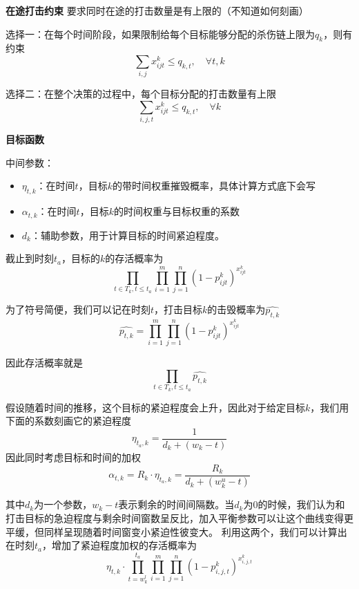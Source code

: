 \textbf{在途打击约束}
要求同时在途的打击数量是有上限的（不知道如何刻画）

选择一：在每个时间阶段，如果限制给每个目标能够分配的杀伤链上限为$q_k$，则有约束
\begin{equation*}
    \sum_{i,j} x_{ijt}^k \leq q_{k, t}, \quad \forall t, k
\end{equation*}

选择二：在整个决策的过程中，每个目标分配的打击数量有上限
\begin{equation*}
    \sum_{i,j,t} x_{ijt}^k \leq q_{k, t}, \quad \forall k
\end{equation*}

\textbf{目标函数}

中间参数：
\begin{itemize}
    \item $\eta_{t,k}$：在时间$t$，目标$k$的带时间权重摧毁概率，具体计算方式底下会写
    \item $\alpha_{t,k}$：在时间$t$，目标$k$的时间权重与目标权重的系数
    \item $d_k$：辅助参数，用于计算目标的时间紧迫程度。
\end{itemize}

截止到时刻$t_a$，目标的$k$的存活概率为
\begin{equation*}
    \prod_{t\in T_k, t \leq t_a}\prod_{i = 1}^{m}\prod_{j=1}^{n}(1-p_{ijt}^k)^{x_{ijt}^k}
\end{equation*}

为了符号简便，我们可以记在时刻$t$，打击目标$k$的击毁概率为$\hat{p_{t,k}}$
\begin{equation*}
    \hat{p_{t,k}} = \prod_{i = 1}^{m}\prod_{j=1}^{n}(1-p_{ijt}^k)^{x_{ijt}^k}
\end{equation*}

因此存活概率就是
\begin{equation*}
    \prod_{t\in T_k, t \leq t_a}\hat{p_{t,k}}
\end{equation*}


假设随着时间的推移，这个目标的紧迫程度会上升，因此对于给定目标$k$，我们用下面的系数刻画它的紧迫程度
\begin{equation*}
    \eta_{t_a,k} = \frac{1}{d_k + (w_k - t)}
\end{equation*}
因此同时考虑目标和时间的加权
\begin{equation*}
    \alpha_{t,k} = R_k \cdot \eta_{t_a,k} = \frac{R_k}{d_k + (w_k^u - t)}
\end{equation*}

其中$d_k$为一个参数，$w_k - t$表示剩余的时间间隔数。当$d_k$为0的时候，我们认为和打击目标的急迫程度与剩余时间窗数呈反比，加入平衡参数可以让这个曲线变得更平缓，但同样呈现随着时间窗变小紧迫性彼变大。
利用这两个，我们可以计算出在时刻$t_a$，增加了紧迫程度加权的存活概率为
\begin{equation*}
    \eta_{t,k} \cdot \prod_{t = w_k^l}^{t_a}\prod_{i = 1}^{m}\prod_{j=1}^{n}(1-p_{i,j,t}^k)^{x_{i,j,t}^k}
\end{equation*}

